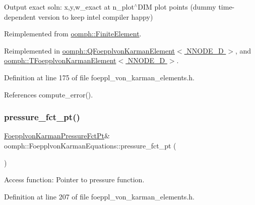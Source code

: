 Output exact soln\+: x,y,w\+\_\+exact at n\+\_\+plot$^\wedge$\+D\+IM plot points (dummy time-\/dependent version to keep intel compiler happy) 



Reimplemented from \hyperlink{classoomph_1_1FiniteElement_a2a8426dccd57b927be0ae0eec00d0479}{oomph\+::\+Finite\+Element}.



Reimplemented in \hyperlink{classoomph_1_1QFoepplvonKarmanElement_aaf40f9b3c63ec3e5feebccaedbe7d012}{oomph\+::\+Q\+Foepplvon\+Karman\+Element$<$ N\+N\+O\+D\+E\+\_\+D $>$}, and \hyperlink{classoomph_1_1TFoepplvonKarmanElement_a742ba8001f20e4c5237d4474c9f1a67b}{oomph\+::\+T\+Foepplvon\+Karman\+Element$<$ N\+N\+O\+D\+E\+\_\+D $>$}.



Definition at line 175 of file foeppl\+\_\+von\+\_\+karman\+\_\+elements.\+h.



References compute\+\_\+error().

\mbox{\label{classoomph_1_1FoepplvonKarmanEquations_a4c7831db80aadea95444bacfee56eb28}} 
\subsubsection{\texorpdfstring{pressure\+\_\+fct\+\_\+pt()}{pressure\_fct\_pt()}\hspace{0.1cm}{\footnotesize\ttfamily [1/2]}}
{\footnotesize\ttfamily \hyperlink{classoomph_1_1FoepplvonKarmanEquations_a39b64f9712ec34f455beb9f4271ff297}{Foepplvon\+Karman\+Pressure\+Fct\+Pt}\& oomph\+::\+Foepplvon\+Karman\+Equations\+::pressure\+\_\+fct\+\_\+pt (\begin{DoxyParamCaption}{ }\end{DoxyParamCaption})\hspace{0.3cm}{\ttfamily [inline]}}



Access function\+: Pointer to pressure function. 



Definition at line 207 of file foeppl\+\_\+von\+\_\+karman\+\_\+elements.\+h.



